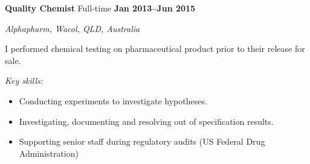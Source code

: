 \textbf{Quality Chemist} \hfill Full-time \textbf{Jan 2013--Jun 2015}\par
\textit{Alphapharm, Wacol, QLD, Australia}\par
I performed chemical testing on pharmaceutical product prior to their release for sale.\par
\vspace{1mm}
\textit{Key skills:} \par
\begin{itemize}
	\item Conducting experiments to investigate hypotheses.
	\item Investigating, documenting and resolving out of specification results.
    \item Supporting senior staff during regulatory audits (US Federal Drug Administration)
\end{itemize}\par